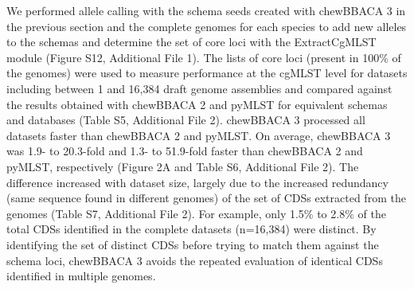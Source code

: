 We performed allele calling with the schema seeds created with chewBBACA 3 in the previous section and the complete genomes for each species to add new alleles to the schemas and determine the set of core loci with the ExtractCgMLST module (Figure S12, Additional File 1). The lists of core loci (present in 100\% of the genomes) were used to measure performance at the cgMLST level for datasets including between 1 and 16,384 draft genome assemblies and compared against the results obtained with chewBBACA 2 and pyMLST \citep{biguenet_introduction_2023} for equivalent schemas and databases (Table S5, Additional File 2). chewBBACA 3 processed all datasets faster than chewBBACA 2 and pyMLST. On average, chewBBACA 3 was 1.9- to 20.3-fold and 1.3- to 51.9-fold faster than chewBBACA 2 and pyMLST, respectively (Figure 2A and Table S6, Additional File 2). The difference increased with dataset size, largely due to the increased redundancy (same sequence found in different genomes) of the set of CDSs extracted from the genomes (Table S7, Additional File 2). For example, only 1.5\% to 2.8\% of the total CDSs identified in the complete datasets (n=16,384) were distinct. By identifying the set of distinct CDSs before trying to match them against the schema loci, chewBBACA 3 avoids the repeated evaluation of identical CDSs identified in multiple genomes.

